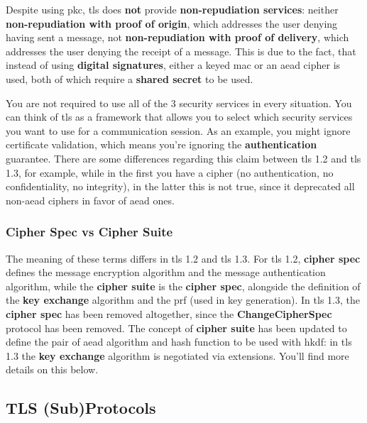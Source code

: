 \documentclass{llncs}
\begin{document}
Despite using \gls{pkc}, \gls{tls} does \textbf{not} provide \textbf{non-repudiation services}:
neither \textbf{non-repudiation with proof of origin}, which addresses the user denying
having sent a message, not \textbf{non-repudiation with proof of delivery}, which
addresses the user denying the receipt of a message. This is due to the fact, that
instead of using \textbf{digital signatures}, either a keyed \gls{mac} or an \gls{aead}
cipher is used, both of which require a \textbf{shared secret} to be used.

You are not required to use all of the 3 security services in every situation.
You can think of \gls{tls} as a framework that allows you to select which security
services you want to use for a communication session. As an example, you might
ignore certificate validation, which means you're ignoring the \textbf{authentication}
guarantee. There are some differences regarding this claim between \gls{tls} 1.2
and \gls{tls} 1.3, for example, while in the first you have a 
cipher (no authentication, no confidentiality, no integrity), in the latter
this is not true, since it deprecated all non-\gls{aead} ciphers in favor of
\gls{aead} ones.

\subsubsection{Cipher Spec vs Cipher Suite}

The meaning of these terms differs in \gls{tls} 1.2 and \gls{tls} 1.3. For \gls{tls} 1.2,
\textbf{cipher spec} defines the message encryption algorithm and the message
authentication algorithm, while the \textbf{cipher suite} is the \textbf{cipher spec},
alongside the definition of the \textbf{key exchange} algorithm and the \gls{prf} (used in key generation). In \gls{tls} 1.3, the
 \textbf{cipher spec} has been removed altogether, since the  \textbf{ChangeCipherSpec}
 protocol has been removed. The concept of \textbf{cipher suite} has been updated
 to define the pair of \gls{aead} algorithm and hash function to be used with
 \gls{hkdf}: in \gls{tls} 1.3 the  \textbf{key exchange} algorithm is negotiated via
 extensions. You'll find more details on this below.

\subsection{TLS (Sub)Protocols}
\end{document}
